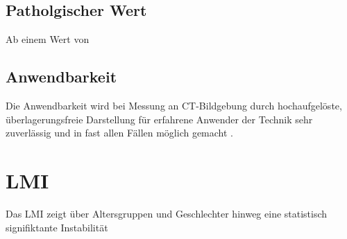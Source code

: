 \documentclass{report}
\begin{document}
\subsection{Patholgischer Wert}
Ab einem Wert von 


\subsection{Anwendbarkeit}
Die Anwendbarkeit wird bei Messung an CT-Bildgebung durch hochaufgelöste, überlagerungsfreie Darstellung für erfahrene Anwender der Technik sehr zuverlässig und in fast allen Fällen möglich gemacht \cite{Dziurzynski2005,Radcliff2010}. 


\section{LMI}
Das LMI zeigt über Altersgruppen und Geschlechter hinweg eine statistisch signifiktante Instabilität \cite{Chaput2011}



\end{document}
